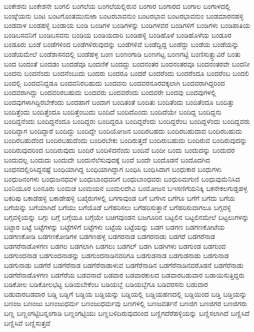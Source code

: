 {ಬಂಕೇಶನು
ಬಂಕೇಶನೇ
ಬಂಗಲಿ
ಬಂಗಲೆಯ
ಬಂಗಲೆಯಲ್ಲಿರುವ
ಬಂಗಾರ
ಬಂಗಾರದ
ಬಂಗಾಲ
ಬಂಗಾಳದಲ್ಲಿ
ಬಂಙ್ಕೆಯನು
ಬಂಟ
ಬಂಟಗೊಂತಮುನುಱಾ
ಬಂಟರಬಾವನುಂ
ಬಂಟರಭಾವ
ಬಂಟರಭಾವನುಂ
ಬಂಡಮಾರನಹಳ್ಳಿ
ಬಂಡವಾಳ
ಬಂಡಹಳ್ಳಿ
ಬಂಡಾಯ
ಬಂಡಿ
ಬಂಡಿಗಳ
ಬಂಡಿಗಳನ್ನು
ಬಂಡಿಗಳವರ
ಬಂಡಿಗಳಿಗೆ
ಬಂಡಿಗಳು
ಬಂಡಿಪಾತಿಯ
ಬಂಡಿಬಸವನಿಗೆ
ಬಂಡಿಬಸವನು
ಬಂಡಿಯ
ಬಂಡಿಯದಾರಿ
ಬಂಡಿಹಳ್ಳಿ
ಬಂಡಿಹೊಳೆ
ಬಂಡಿಹೊಳೆಯ
ಬಂಡೂರ
ಬಂಡೂರು
ಬಂಡೆ
ಬಂಡೆಗಳಿಂದ
ಬಂಡೆಗಳಿರುವುದನ್ನು
ಬಂಡೆಗಳಿವೆ
ಬಂಡೆದ್ದಿದ್ದ
ಬಂಡೆದ್ದು
ಬಂಡೆಯ
ಬಂಡೆಯನ್ನು
ಬಂಡೆಯಮೇಲೆ
ಬಂಡೆಶಾಸನದಲ್ಲಿ
ಬಂಡೆಹಳ್ಳ
ಬಂಣ
ಬಂಣಂಗಾಡಿ
ಬಂಣಗಟ್ಟ
ಬಂಣಗಟ್ಟಿ
ಬಂಣಿಸುತ್ತ್ತುವಿರೆ
ಬಂತು
ಬಂದ
ಬಂದಂತೆ
ಬಂದಡಂ
ಬಂದಡೆವೂ
ಬಂದಣಿಕೆ
ಬಂದದ್ದು
ಬಂದನಂತರ
ಬಂದನಂತರವೂ
ಬಂದನಂತರವೇ
ಬಂದನೀ
ಬಂದನು
ಬಂದನೆಂದು
ಬಂದನೆಂಬುದು
ಬಂದರು
ಬಂದರೂ
ಬಂದರೆ
ಬಂದರೆಂದು
ಬಂದರೆಂದೂ
ಬಂದರೆಂಬ
ಬಂದಲಿ
ಬಂದಲ್ಲಿ
ಬಂದವನಿದ್ದಡೂ
ಬಂದವನಿರಬಹುದು
ಬಂದವನು
ಬಂದವರನೂರವಕ್ಕಲಾಗಿ
ಬಂದವರಾಗಿದ್ದರಿಂದ
ಬಂದವರಾಗಿದ್ದು
ಬಂದವರಿರಬಹುದು
ಬಂದವರು
ಬಂದವರೆಂದು
ಬಂದವರೇ
ಬಂದವು
ಬಂದವುಗಳಲ್ಲಿ
ಬಂದವುಗಳಾಗಿದ್ದಿರಬೇಕೆಂದು
ಬಂದಹಾಗೆ
ಬಂದಾಗ
ಬಂದಿತಂತೆ
ಬಂದಿತು
ಬಂದಿತೆಂದು
ಬಂದಿತೆಂದೂ
ಬಂದಿತ್ತು
ಬಂದಿತ್ತೆಂದು
ಬಂದಿತ್ತೆಂದೂ
ಬಂದಿತ್ತೆಂಬುದು
ಬಂದಿದೆ
ಬಂದಿದೆಎಂದು
ಬಂದಿದೆಯೇ
ಬಂದಿದ್ದ
ಬಂದಿದ್ದನು
ಬಂದಿದ್ದನೆಂದು
ಬಂದಿದ್ದನೆಂದೂ
ಬಂದಿದ್ದರು
ಬಂದಿದ್ದರೂ
ಬಂದಿದ್ದರೆಂದು
ಬಂದಿದ್ದರೆಂಬ
ಬಂದಿದ್ದಳೆಂದು
ಬಂದಿದ್ದವರು
ಬಂದಿದ್ದಾಗ
ಬಂದಿದ್ದಾರೆ
ಬಂದಿದ್ದು
ಬಂದಿದ್ದೇ
ಬಂದಿಯೋಜನ
ಬಂದಿರಬಹದು
ಬಂದಿರಬಹುದಾದ
ಬಂದಿರಬಹುದು
ಬಂದಿರಬಹುದೆಂದ
ಬಂದಿರಬಹುದೆಂದು
ಬಂದಿರಬೇಕು
ಬಂದಿರುತ್ತದೆ
ಬಂದಿರುಬಹುದು
ಬಂದಿರುವ
ಬಂದಿರುವುದನ್ನು
ಬಂದಿರುವುದರಿಂದ
ಬಂದಿರುವುದು
ಬಂದಿರೆ
ಬಂದಿಳಿದನೆಂದು
ಬಂದಿವೆ
ಬಂದೀ
ಬಂದು
ಬಂದುದನ್ನು
ಬಂದುದರ
ಬಂದುದಲ್ಲ
ಬಂದುದು
ಬಂದುದೇ
ಬಂದುನೆಲೆಸುವುದಕ್ಕೆ
ಬಂದೆ
ಬಂದೇ
ಬಂದೊಡನೆ
ಬಂದೊದಗಿದ
ಬಂಧನದಲ್ಲಿರಿಸಿದ್ದನಷ್ಟೆ
ಬಂಧಿಯಾಗಿದ್ದ
ಬಂಧಿಯಾಗಿದ್ದಾಗ
ಬಂಧಿಸಿ
ಬಂಧಿಸಿದಾಗ
ಬಂಧುಕಾರ
ಬಂಧುಗಳು
ಬಂಧುಜನಂಗಳು
ಬಂಧುಜನಧವಳ
ಬಂಧುಬಾಂಧವರಿಗೆ
ಬಂಧುಬಾಂಧವರು
ಬಂಧುರಿಮಗುಣಿ
ಬಂಧುವುಮೆನಿಸಿದ
ಬಂನಿಯೂರ
ಬಂನೂರು
ಬಂಮಚ
ಬಂಮಯನ
ಬಂಮಲದೇವಿ
ಬಂಮೋಜನ
ಬಇಸಣಿಗೆಯನಿಕ್ಕಿ
ಬಕನೇಕಲಗುಡ್ಡಹಳ್ಳ
ಬಕರಿಪು
ಬಕಾಡೆಹಳ್ಳಿ
ಬಕಾಡೇಹಳ್ಳಿ
ಬಖೈರುಗಳಲ್ಲಿ
ಬಗಗಾವುಂಡ
ಬಗೆ
ಬಗೆಗಿನ
ಬಗೆಗೂ
ಬಗೆಗೆ
ಬಗೆದು
ಬಗೆಯ
ಬಗೆಯನ್ನು
ಬಗೆಯಾಗಿದೆ
ಬಗೆಯು
ಬಗೆಯೊಡೆ
ಬಗೆಹರಿಸಲು
ಬಗೆಹರಿಸುತ್ತಾನೆ
ಬಗೆಹರಿಸುವಾಗಲೂ
ಬಗ್ಗವಳ್ಳಿ
ಬಗ್ಗವಳ್ಳಿಯನ್ನು
ಬಗ್ಗು
ಬಗ್ಗೆ
ಬಗ್ಗೆಯೂ
ಬಗ್ಗೆಯೇ
ಬಚಿಗವುಂಡನ
ಬಜಗೂರಿನ
ಬಟ್ಟಲಿನ
ಬಟ್ಟಲಿನಮೇಲೆ
ಬಟ್ಟಲುಗಳನ್ನು
ಬಟ್ಟಾರ
ಬಟ್ಟೆ
ಬಟ್ಟೆಗಳನ್ನು
ಬಟ್ಟೆಗಳಿಗೆ
ಬಟ್ಟೆಗಳು
ಬಟ್ಟೆಯ
ಬಟ್ಟೆಯನ್ನು
ಬಡಗ
ಬಡಗಣ
ಬಡಗಣಕೋಟೆಯ
ಬಡಗಣಕೋಡಿ
ಬಡಗಣಕೋಡಿಗಳ
ಬಡಗಣಹಳ್ಳ
ಬಡಗರನಾಡ
ಬಡಗರನಾಡು
ಬಡಗರೆ
ಬಡಗರೆನಾಡ
ಬಡಗರೆನಾಡೊಳಗಣ
ಬಡಗಲ
ಬಡಗಲಾಗಿ
ಬಡಗಲು
ಬಡಗಲ್
ಬಡಗಿ
ಬಡಗಿಗಳು
ಬಡಗುಂಡ
ಬಡಗುಂದ
ಬಡಗುಂದನಾಡ
ಬಡಗುಂದನಾಡನ್ನು
ಬಡಗುಂದನಾಡಿನವರಿಗೂ
ಬಡಗುಡನಾಡ
ಬಡಗುಡನಾಡು
ಬಡಗುನಾಡ
ಬಡಗುನಾಡು
ಬಡಗೆರೆ
ಬಡಗೆರೆನಾಡ
ಬಡಗೆರೆನಾಡಾಳುವ
ಬಡಗೆರೆನಾಡಿನ
ಬಡಗೆರೆನಾಡಿನವರೊಡನೆ
ಬಡಗೆರೆನಾಡು
ಬಡಗೆರೆನಾಡೊಳಗಣ
ಬಡಗೆರೆಯ
ಬಡವನಾದೆ
ಬಡವಾರ
ಬಡವಾರಕುಲದ
ಬಡವಾರಬಡುವಾರ
ಬಡಾಯಿಸುತ್ತಿದ್ದರು
ಬಡಿಕೋಲ
ಬಡಿಕೋಲಭಟ್ಟ
ಬಡಿಯಬೇಕೆಂಬ
ಬಡಿಯಬ್ಬೆ
ಬಡಿಯಬ್ಬೆಗೂ
ಬಡಿವರಸನು
ಬಡುವಾರ
ಬಡುವಾರಬಡವಾರ
ಬಡ್ಡಿ
ಬಡ್ಡಿಗೆ
ಬಡ್ಡಿಯ
ಬಡ್ಡಿಯನ್ನು
ಬಡ್ಡಿಯಲ್ಲಿ
ಬಡ್ಡಿಯಹಣದಲ್ಲಿ
ಬಡ್ಡಿಯಿಂದ
ಬಡ್ತಿ
ಬಡ್ತಿಯನ್ನು
ಬಣಂಜ
ಬಣಂಜು
ಬಣಂಜುಧರ್ಮ
ಬಣಂಜುಧರ್ಮವು
ಬಣಗಳಲ್ಲಿ
ಬಣಜವರ್ತನೆ
ಬಣಜಿಗ
ಬಣಜಿಗರ
ಬಣಜಿಗರು
ಬಣ್ಣ
ಬಣ್ಣಂಗಟ್ಟಿಬನ್ನಂಗಾಡಿ
ಬಣ್ಣಂಗಟ್ಟಿಯು
ಬಣ್ಣಬಳಿದಿರುವುದರಿಂದ
ಬಣ್ಣಿಗದೆರೆಹಳ್ಳಿಯನ್ನು
ಬಣ್ಣಿಸಲಾಗಿದೆ
ಬಣ್ಣಿಸಿದೆ
ಬಣ್ಣಿಸಿವೆ
ಬಣ್ಣಿಸುತ್ತದೆ
}

